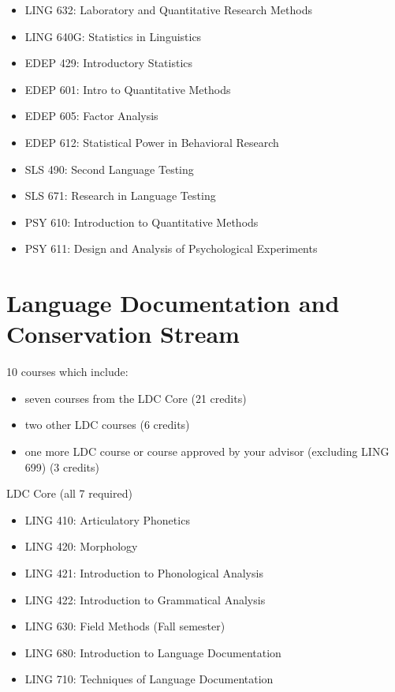 \documentclass[
]{book}
\providecommand{\tightlist}{%
  \setlength{\itemsep}{0pt}\setlength{\parskip}{0pt}}
\begin{document}
\begin{itemize}
\tightlist
\item
  LING 632: Laboratory and Quantitative Research Methods
\item
  LING 640G: Statistics in Linguistics
\item
  EDEP 429: Introductory Statistics
\item
  EDEP 601: Intro to Quantitative Methods
\item
  EDEP 605: Factor Analysis
\item
  EDEP 612: Statistical Power in Behavioral Research
\item
  SLS 490: Second Language Testing
\item
  SLS 671: Research in Language Testing
\item
  PSY 610: Introduction to Quantitative Methods
\item
  PSY 611: Design and Analysis of Psychological Experiments
\end{itemize}

\section{Language Documentation and Conservation Stream}\label{ldc-stream}

10 courses which include:

\begin{itemize}
\tightlist
\item
  seven courses from the LDC Core (21 credits)
\item
  two other LDC courses (6 credits)
\item
  one more LDC course or course approved by your advisor (excluding LING 699) (3 credits)
\end{itemize}

LDC Core (all 7 required)

\begin{itemize}
\tightlist
\item
  LING 410: Articulatory Phonetics
\item
  LING 420: Morphology
\item
  LING 421: Introduction to Phonological Analysis
\item
  LING 422: Introduction to Grammatical Analysis
\item
  LING 630: Field Methods (Fall semester)
\item
  LING 680: Introduction to Language Documentation
\item
  LING 710: Techniques of Language Documentation
\end{itemize}
\end{document}
